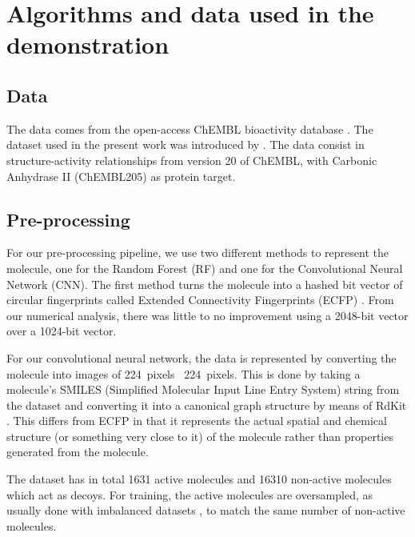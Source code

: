 \documentclass[\ifafour a4paper,12pt,\else a5paper,10pt,\fi%
onecolumn,oneside,article,%
british%
]{memoir}
\theoremstyle{remark}
\theoremstyle{innote}
\renewcommand*{\|}[1][]{\nonscript\:#1\vert\nonscript\:\mathopen{}}
\begin{document}
\section{Algorithms and data used in the demonstration}
\label{sec:appendix_algorithms} 

\subsection{Data} 
  
The data comes from the open-access ChEMBL bioactivity database \autocites{bentoetal2014}. The dataset used in the present work was introduced by \textcite{koutsoukasetal2017}. The data consist in structure-activity relationships from version 20 of ChEMBL, with Carbonic Anhydrase II (ChEMBL205) as protein target.


\subsection{Pre-processing} 

For our pre-processing pipeline, we use two different methods to represent the molecule, one for the Random Forest (RF) and one for the Convolutional Neural Network (CNN). The first method turns the molecule into a hashed bit vector of circular fingerprints called Extended Connectivity Fingerprints (ECFP) \autocites{rogersetal2010}. From our numerical analysis, there was little to no improvement using a 2048-bit vector over a 1024-bit vector. 
  
For our convolutional neural network, the data is represented by converting the molecule into images of 224~pixels \texttimes\ 224~pixels. This is done by taking a molecule's SMILES (Simplified Molecular Input Line Entry System) string \autocites{davidetal2020} from the dataset and converting it into a canonical graph structure by means of RdKit \autocites{rdkit2017}. This differs from ECFP in that it represents the actual spatial and chemical structure (or something very close to it) of the molecule rather than properties generated from the molecule.

The dataset has in total 1631 active molecules and 16310 non-active molecules which act as decoys. For training, the active molecules are oversampled, as usually done with imbalanced datasets \autocites{provost2000}, to match the same number of non-active molecules.
\end{document}
